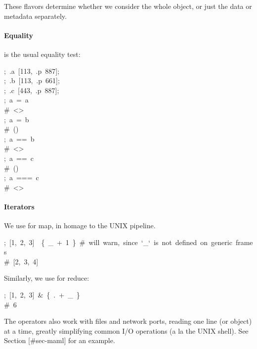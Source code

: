 \documentclass[preprint]{{acmart}}
\begin{document}
These flavors determine whether we consider the whole object, or just the data
or metadata separately.%

\paragraph{Equality}\label{sec-equality}%

\noindent{}\mdcode{=} is the usual equality test:%
\begin{mdpre}%
\noindent;~.a~{}[{113},~.p~{887}];\\
;~.b~{}[{113},~.p~{661}];\\
;~.c~{}[{443},~.p~{887}];\\
;~a~=~a\\
{\#~\textless{}\textgreater{}}\\
;~a~=~b\\
{\#~()}\\
;~a~==~b\\
{\#~\textless{}\textgreater{}}\\
;~a~==~c\\
{\#~()}\\
;~a~===~c\\
{\#~\textless{}\textgreater{}}%
\end{mdpre}
\paragraph{Iterators}\label{sec-iterators}%

\noindent{}We use \mdcode{\textbar{}} for map, in homage to the UNIX pipeline.%
\begin{mdpre}%
\noindent;~{}[1,~2,~3]~\textbar{}~\{~\_~+~1~\}~{\#~will~warn,~since~`\_`~is~not~defined~on~generic~frames}\\
{\#~{}[2,~3,~4]}%
\end{mdpre}\noindent{}Similarly, we use \mdcode{\&} for reduce:
\begin{mdpre}%
\noindent;~{}[1,~2,~3]~\&~\{~.~+~\_~\}\\
{\#~6}%
\end{mdpre}\noindent{}The operators also work with files and network ports, reading one line
(or object) at a time, greatly simplifying common I/O operations (a la
the UNIX shell). See Section [\#sec-maml] for an example.
\end{document}
